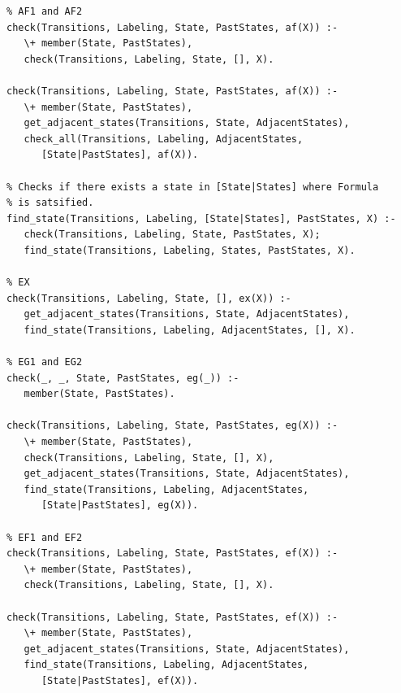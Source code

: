 \documentclass[a4paper, 11pt]{article}
\begin{document}
\begin{lstlisting}
% AF1 and AF2
check(Transitions, Labeling, State, PastStates, af(X)) :-
   \+ member(State, PastStates),
   check(Transitions, Labeling, State, [], X).

check(Transitions, Labeling, State, PastStates, af(X)) :-
   \+ member(State, PastStates),
   get_adjacent_states(Transitions, State, AdjacentStates),
   check_all(Transitions, Labeling, AdjacentStates,
      [State|PastStates], af(X)).

% Checks if there exists a state in [State|States] where Formula 
% is satsified.
find_state(Transitions, Labeling, [State|States], PastStates, X) :-
   check(Transitions, Labeling, State, PastStates, X);
   find_state(Transitions, Labeling, States, PastStates, X).

% EX
check(Transitions, Labeling, State, [], ex(X)) :-
   get_adjacent_states(Transitions, State, AdjacentStates),
   find_state(Transitions, Labeling, AdjacentStates, [], X).

% EG1 and EG2
check(_, _, State, PastStates, eg(_)) :-
   member(State, PastStates).

check(Transitions, Labeling, State, PastStates, eg(X)) :-
   \+ member(State, PastStates),
   check(Transitions, Labeling, State, [], X),
   get_adjacent_states(Transitions, State, AdjacentStates),
   find_state(Transitions, Labeling, AdjacentStates, 
      [State|PastStates], eg(X)).
	
% EF1 and EF2
check(Transitions, Labeling, State, PastStates, ef(X)) :-
   \+ member(State, PastStates),
   check(Transitions, Labeling, State, [], X).

check(Transitions, Labeling, State, PastStates, ef(X)) :-
   \+ member(State, PastStates),
   get_adjacent_states(Transitions, State, AdjacentStates),
   find_state(Transitions, Labeling, AdjacentStates, 
      [State|PastStates], ef(X)).
\end{lstlisting}
\end{document}
